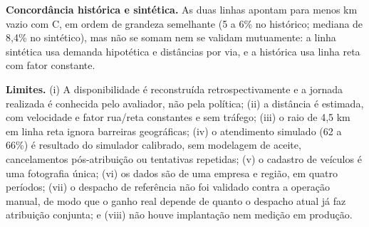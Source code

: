 \textbf{Concordância histórica e sintética.} As duas linhas apontam para menos km vazio com C, em ordem de grandeza semelhante (5 a 6\% no histórico; mediana de 8,4\% no sintético), mas não se somam nem se validam mutuamente: a linha sintética usa demanda hipotética e distâncias por via, e a histórica usa linha reta com fator constante.

\textbf{Limites.} (i) A disponibilidade é reconstruída retrospectivamente e a jornada realizada é conhecida pelo avaliador, não pela política; (ii) a distância é estimada, com velocidade e fator rua/reta constantes e sem tráfego; (iii) o raio de 4,5 km em linha reta ignora barreiras geográficas; (iv) o atendimento simulado (62 a 66\%) é resultado do simulador calibrado, sem modelagem de aceite, cancelamentos pós-atribuição ou tentativas repetidas; (v) o cadastro de veículos é uma fotografia única; (vi) os dados são de uma empresa e região, em quatro períodos; (vii) o despacho de referência não foi validado contra a operação manual, de modo que o ganho real depende de quanto o despacho atual já faz atribuição conjunta; e (viii) não houve implantação nem medição em produção.
